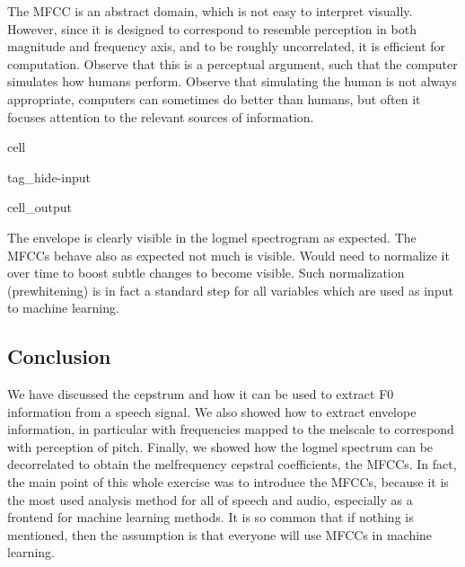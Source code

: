 \documentclass[letterpaper,10pt,english]{jupyterBook}
\begin{document}
\sphinxAtStartPar
The MFCC is an abstract domain, which is not easy to interpret visually. However, since it is designed to correspond to resemble perception in both magnitude and frequency axis, and to be roughly uncorrelated, it is efficient for computation. Observe that this is a perceptual argument, such that the computer simulates how humans perform. Observe that simulating the human is not always appropriate, computers can sometimes do better than humans, but often it focuses attention to the relevant sources of information.

\begin{sphinxuseclass}{cell}
\begin{sphinxuseclass}{tag_hide-input}\begin{sphinxVerbatimOutput}

\begin{sphinxuseclass}{cell_output}
\noindent{}

\noindent{}

\noindent{}

\end{sphinxuseclass}\end{sphinxVerbatimOutput}

\end{sphinxuseclass}
\end{sphinxuseclass}
\sphinxAtStartPar
The envelope is clearly visible in the log\sphinxhyphen{}mel spectrogram as expected. The MFCCs behave also as expected \sphinxhyphen{} not much is visible. Would need to normalize it over time to boost subtle changes to become visible. Such normalization (pre\sphinxhyphen{}whitening) is in fact a standard step for all variables which are used as input to machine learning.


\subsection{Conclusion}
\label{\detokenize{Representations/Melcepstrum:conclusion}}
\sphinxAtStartPar
We have discussed the cepstrum and how it can be used to extract F0 information from a speech signal. We also showed how to extract envelope information, in particular with frequencies mapped to the mel\sphinxhyphen{}scale to correspond with perception of pitch. Finally, we showed how the log\sphinxhyphen{}mel spectrum can be decorrelated to obtain the mel\sphinxhyphen{}frequency cepstral coefficients, the MFCCs. In fact, the main point of this whole exercise was to introduce the MFCCs, because it is the most used analysis method for all of speech and audio, especially as a front\sphinxhyphen{}end for machine learning methods. It is so common that if nothing is mentioned, then the assumption is that everyone will use MFCCs in machine learning.
\end{document}
